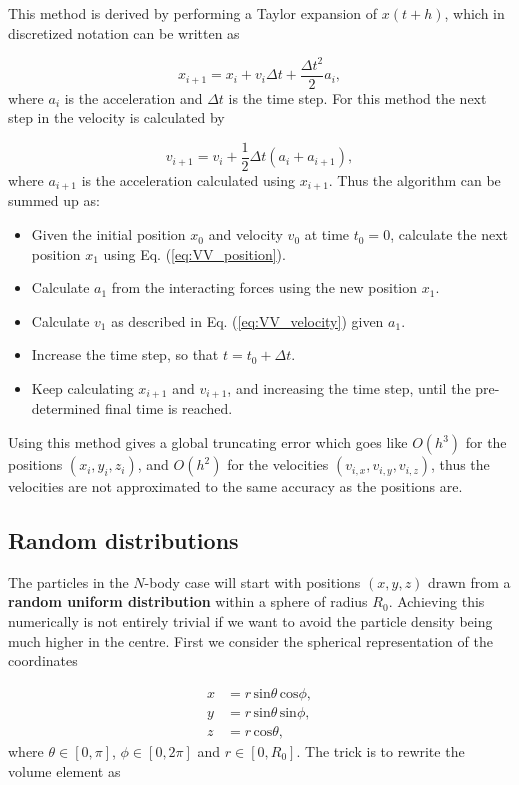 \documentclass{article}
\begin{document}
\begin{multicols}{2}
This method is derived by performing a Taylor expansion of $x(t+h)$, which in discretized notation can be written as

\begin{equation}\label{eq:VV_position}
	x_{i+1} = x_i + v_i \Delta t + \frac{\Delta t^2}{2}a_i,
\end{equation}
where $a_i$ is the acceleration and $\Delta t$ is the time step. For this method the next step in the velocity is calculated by

\begin{equation}\label{eq:VV_velocity}
	v_{i+1} = v_i + \frac{1}{2}\Delta t (a_i + a_{i+1}),
\end{equation}
where $a_{i+1}$ is the acceleration calculated using $x_{i+1}$. Thus the algorithm can be summed up as:

\begin{itemize}
	\item Given the initial position $x_0$ and velocity $v_0$ at time $t_0 = 0$, calculate the next position $x_1$ using Eq. (\ref{eq:VV_position}).
	\item Calculate $a_1$ from the interacting forces using the new position $x_1$.
	\item Calculate $v_1$ as described in Eq. (\ref{eq:VV_velocity}) given $a_1$.
	\item Increase the time step, so that $t = t_0 + \Delta t$. 
	\item Keep calculating $x_{i+1}$ and $v_{i+1}$, and increasing the time step, until the pre-determined final time is reached.
\end{itemize}
Using this method gives a global truncating error which goes like $O(h^3)$ for the positions $(x_i,y_i,z_i)$, and $O(h^2)$ for the velocities $(v_{i,x},v_{i,y},v_{i,z})$, thus the velocities are not approximated to the same accuracy as the positions are. 




\subsection{Random distributions}
The particles in the $N$-body case will start with positions $(x,y,z)$ drawn from a \textbf{random uniform distribution} within a sphere of radius $R_0$. Achieving this numerically is not entirely trivial if we want to avoid the particle density being much higher in the centre. First we consider the spherical representation of the coordinates

\begin{equation}\label{eq:coord_transf}
\begin{aligned}
	x &= r \, \mathrm{sin}\theta \, \mathrm{cos}\phi, \\
	y &= r \, \mathrm{sin}\theta \, \mathrm{sin}\phi, \\
	z &= r \, \mathrm{cos}\theta,
\end{aligned}
\end{equation}
where $\theta \in [0,\pi]$, $\phi \in [0,2\pi]$ and $r \in [0,R_0]$. The trick is to rewrite the volume element as


\end{multicols}
\end{document}

